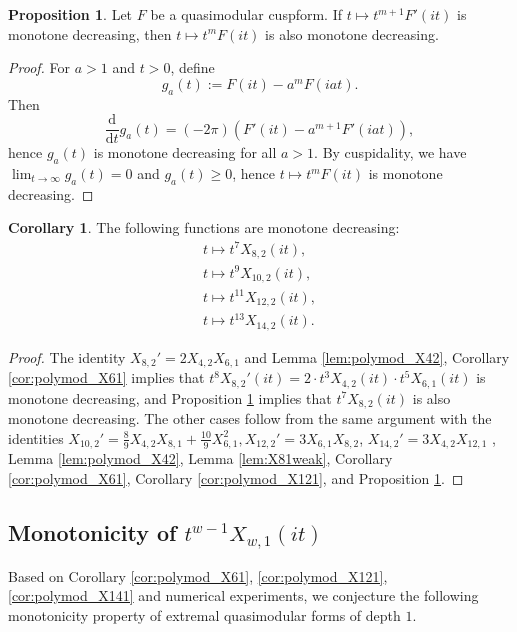 \documentclass[10pt,reqno]{amsproc}
\newcommand{\dd}{\mathrm{d}}
\newcommand{\1}{\mathds{1}}	%
\theoremstyle{definition}
\newtheorem{proposition}[theorem]{Proposition}
\newtheorem{corollary}[theorem]{Corollary}
\theoremstyle{remark}
\begin{document}
\begin{proposition}
    \label{prop:polymod_der}
    Let $F$ be a quasimodular cuspform.
    If $t \mapsto t^{m+1} F'(it)$ is monotone decreasing, then $t \mapsto t^m F(it)$ is also monotone decreasing.
\end{proposition}
\begin{proof}
    For $a > 1$ and $t > 0$, define
    \[
    g_a(t) := F(it) - a^{m} F(iat).
    \]
    Then
    \[
    \frac{\dd}{\dd t} g_a(t) = (-2 \pi) (F'(it) - a^{m+1} F'(iat)),
    \]
    hence $g_a(t)$ is monotone decreasing for all $a > 1$.
    By cuspidality, we have $\lim_{t \to \infty} g_a(t) = 0$ and $g_a(t) \ge 0$, hence $t \mapsto t^m F(it)$ is monotone decreasing.
\end{proof}

\begin{corollary}
    \label{cor:polymod_extd2}
    The following functions are monotone decreasing:
    \begin{align*}
        t \mapsto t^{7} X_{8, 2}(it), \\
        t \mapsto t^{9} X_{10, 2}(it), \\
        t \mapsto t^{11} X_{12, 2}(it), \\
        t \mapsto t^{13} X_{14, 2}(it).
    \end{align*}
\end{corollary}
\begin{proof}
    The identity $X_{8, 2}' = 2 X_{4, 2} X_{6, 1}$ \cite[eq. (46)]{lee2024algebraic} and Lemma \ref{lem:polymod_X42}, Corollary \ref{cor:polymod_X61} implies that $t^{8} X_{8, 2}'(it) = 2 \cdot t^3 X_{4, 2}(it) \cdot t^5 X_{6, 1}(it)$ is monotone decreasing, and Proposition \ref{prop:polymod_der} implies that $t^{7} X_{8, 2}(it)$ is also monotone decreasing.
    The other cases follow from the same argument with the identities $X_{10, 2}' = \frac{8}{9} X_{4, 2} X_{8, 1} + \frac{10}{9} X_{6, 1}^2, X_{12, 2}' = 3 X_{6, 1} X_{8, 2}$, $X_{14, 2}' = 3X_{4, 2} X_{12, 1}$ \cite[eq. (47) (48), (49)]{lee2024algebraic}, Lemma \ref{lem:polymod_X42}, Lemma \ref{lem:X81weak}, Corollary \ref{cor:polymod_X61}, Corollary \ref{cor:polymod_X121}, and Proposition \ref{prop:polymod_der}.
\end{proof}

\subsection{Monotonicity of $t^{w-1}X_{w, 1}(it)$}

Based on Corollary \ref{cor:polymod_X61}, \ref{cor:polymod_X121}, \ref{cor:polymod_X141} and numerical experiments, we conjecture the following monotonicity property of extremal quasimodular forms of depth $1$.
\end{document}
